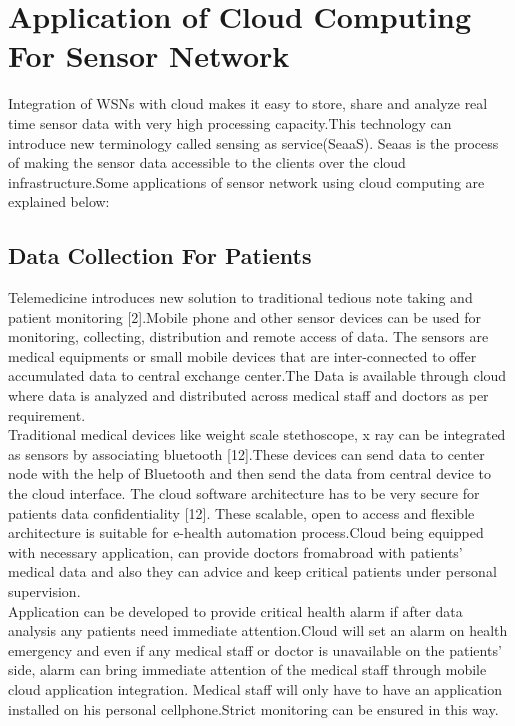 \documentclass {report}
\begin{document}
\section{Application of Cloud Computing For Sensor Network}
Integration of WSNs with cloud makes it easy to store, share and analyze real time sensor data with very high processing capacity.This technology can introduce new terminology called sensing as service(SeaaS).
Seaas is the process of making the sensor data accessible to the clients over the cloud infrastructure.Some applications of sensor network using cloud computing are explained below:\\

\subsection{Data Collection For Patients}
Telemedicine introduces new solution to traditional tedious note taking and patient monitoring [2].Mobile phone and other sensor devices can be used for monitoring, collecting, distribution and remote access of data.
The sensors are medical equipments or small mobile devices that are inter-connected to offer accumulated data to central exchange center.The Data is available through cloud where data is analyzed and distributed across medical staff and doctors as per requirement.\\
\indent Traditional medical devices like weight scale stethoscope, x ray can be integrated as sensors by associating bluetooth [12].These devices can send data to center node with the help of Bluetooth and then send the data from central device to the cloud interface. 
The cloud software architecture has to be very secure for patients data confidentiality [12].
These scalable, open to access and flexible architecture is suitable for e-health automation process.Cloud being equipped with necessary application, can provide doctors fromabroad with patients' medical data and also they can advice and keep critical patients under personal supervision.\\
\indent Application can be developed to provide critical health alarm if after data analysis
any patients need immediate attention.Cloud will set an alarm on health emergency and even if any medical staff or doctor is unavailable on the patients' side, alarm can bring immediate attention of the medical staff through mobile cloud application integration.
Medical staff will only have to have an application installed on his personal cellphone.Strict monitoring can be ensured in this way.\\
\end{document}
